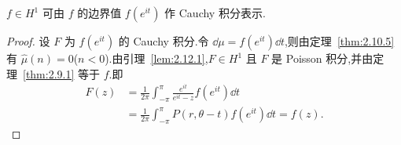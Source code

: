 \begin{proposition}\label{prop:2.12.3}
$f \in H^{1}$ 可由 $f$ 的边界值 $f(e^{it})$ 作 Cauchy 积分表示.
\end{proposition}

\begin{proof}
设 $F$ 为 $f(e^{it})$ 的 Cauchy 积分.令 $\dd \mu = f(e^{it})\dd t$,则由定理~\ref{thm:2.10.5} 有 $\hat{\mu}(n) = 0$($n < 0$).由引理~\ref{lem:2.12.1},$F \in H^{1}$ 且 $F$ 是 Poisson 积分,并由定理~\ref{thm:2.9.1} 等于 $f$.即
\begin{align*}
F(z) & = \frac{1}{2\pi}\int_{-\pi}^{\pi} \frac{e^{it}}{e^{it} - z} f(e^{it})\dd t \\
& = \frac{1}{2\pi}\int_{-\pi}^{\pi} P(r, \theta - t) f(e^{it})\dd t = f(z).
\end{align*}
\end{proof}
